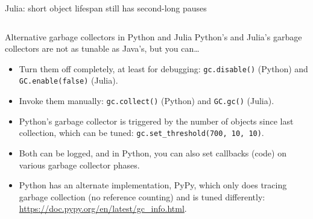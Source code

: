 \documentclass[aspectratio=169]{beamer}
\begin{document}
\begin{frame}{Julia: short object lifespan still has second-long pauses}
\vspace{0.25 cm}
\begin{columns}
\end{columns}
\end{frame}

\begin{frame}{Alternative garbage collectors in Python and Julia}
\vspace{0.5 cm}
Python's and Julia's garbage collectors are not as tunable as Java's, but you can\ldots

\vspace{0.25 cm}
\begin{itemize}\setlength{\itemsep}{0.2 cm}
\item Turn them off completely, at least for debugging: \texttt{gc.disable()} (Python) and \texttt{GC.enable(false)} (Julia).
\item Invoke them manually: \texttt{gc.collect()} (Python) and \texttt{GC.gc()} (Julia).
\item Python's garbage collector is triggered by the number of objects since last collection, which can be tuned: \texttt{gc.set_threshold(700, 10, 10)}.
\item Both can be logged, and in Python, you can also set callbacks (code) on various garbage collector phases.
\item Python has an alternate implementation, PyPy, which only does tracing garbage collection (no reference counting) and is tuned differently: \textcolor{blue}{\small\url{https://doc.pypy.org/en/latest/gc_info.html}}.
\end{itemize}
\end{frame}
\end{document}

